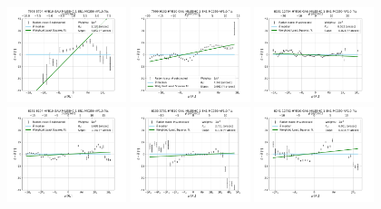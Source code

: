 \begin{figure}
    \centering
    \includegraphics[width=0.31\textwidth]{Images/WLSFITS/CC1/7958-3704.png}
    \includegraphics[width=0.31\textwidth]{Images/WLSFITS/CC1/7990-9102.png}
    \includegraphics[width=0.31\textwidth]{Images/WLSFITS/CC1/8131-12704.png}
    \includegraphics[width=0.31\textwidth]{Images/WLSFITS/CC1/8131-6104.png}
    \includegraphics[width=0.31\textwidth]{Images/WLSFITS/CC1/8133-3701.png}
    \includegraphics[width=0.31\textwidth]{Images/WLSFITS/CC1/8241-12702.png}

\end{figure}
